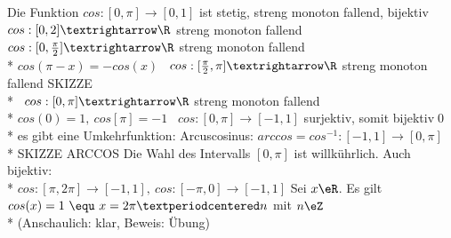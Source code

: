 Die Funktion $cos:[0,\pi]→[0,1]$ ist stetig, streng monoton fallend, bijektiv
\bew
$cos:[0,2]→\R$ streng monoton fallend \Rarr\ $cos:[0,\frac{\pi}{2}]→\R$ streng monoton fallend\\*
$cos(\pi-x)=-cos(x)$ \Rarr\ $cos:[\frac{\pi}{2},\pi]→\R$ streng monoton fallend SKIZZE\\*
\Rarr\ $cos:[0,\pi]→\R$ streng monoton fallend\\*
$cos(0)=1,\ cos[\pi]=-1$ \Rarr\ $cos:[0,\pi]→[-1,1]$ surjektiv, somit bijektiv\qed\\*
 es gibt eine Umkehrfunktion:
Arcuscosinus: $arccos=cos^{-1}:[-1,1]→[0,\pi]$\\*
SKIZZE ARCCOS
\bem
Die Wahl des Intervalls $[0,\pi]$ ist willkührlich. Auch bijektiv:\\*
$cos:[\pi,2\pi]→[-1,1],\ cos:[-\pi,0]→[-1,1]$
\bem
Sei $x\eR$. Es gilt $cos(x)=1\ \equ\ x=2\pi·n$ mit $n\eZ$\\*
(Anschaulich: klar, Beweis: Übung)

